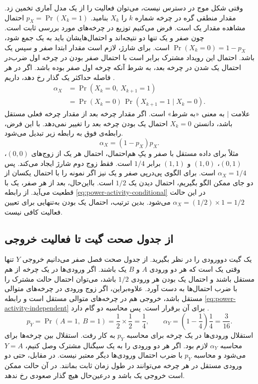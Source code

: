 وقتی شکل موج در دسترس نیست، می‌توان فعالیت را از یک مدل آماری
تخمین زد. مقدار منطقی گره در چرخه شماره \(k\) را \(X_k\) بنامید.
\(p_X=\Pr(X_k=1)\) احتمال مشاهده مقدار یک است. فرض می‌کنیم توزیع
در چرخه‌های مورد بررسی ثابت است. چون صفر و یک تنها دو نتیجه‌اند و
احتمال‌هایشان باید به یک جمع شود، \(\Pr(X_k=0)=1-p_X\) است.
برای شارژ، لازم است مقدار ابتدا صفر و سپس یک باشد. احتمال این
رویداد مشترک برابر است با احتمال صفر بودن در چرخه اول ضرب‌در
احتمال یک شدن در چرخه بعد، به شرط آنکه چرخه اول صفر بوده باشد.
اگر در هر فاصله حداکثر یک گذار رخ دهد، داریم
\cite[بخش ، صفحه ۱۸۷]{weste}
\cite[اسلایدهای ۱۴ و ۱۵]{powerslides}.
\begin{equation}
  \begin{aligned}
    \alpha_X
      &=\Pr(X_k=0,\ X_{k+1}=1)\\
      &=\Pr(X_k=0)\,\Pr(X_{k+1}=1\mid X_k=0).
  \end{aligned}
  \label{eq:power-activity-conditional}
\end{equation}
علامت \(\mid\) به معنی «به شرط» است. اگر مقدار چرخه بعد از مقدار
چرخه فعلی مستقل باشد، دانستن \(X_k=0\) احتمال یک بودن چرخه بعد را
تغییر نمی‌دهد. با این فرض، رابطه‌ی فوق به رابطه زیر تبدیل می‌شود.
\begin{equation}
  \alpha_X=(1-p_X)p_X.
  \label{eq:power-activity-independent}
\end{equation}
مثلاً برای داده مستقل با صفر و یکِ هم‌احتمال، احتمال هر یک از زوج‌های
\((0,0)\)، \((0,1)\)، \((1,0)\) و \((1,1)\) برابر \(1/4\)
است. فقط زوج دوم شارژ ایجاد می‌کند. پس \(\alpha_X=1/4\) است.
برای الگوی پی‌درپی صفر و یک نیز اگر نمونه را با احتمال یکسان از دو
جای ممکن الگو بگیریم، احتمال دیدن یک \(1/2\) است. بااین‌حال، بعد
از هر صفر، یک با قطعیت می‌آید. از رابطه
\eqref{eq:power-activity-conditional} در این حالت
\(\alpha_X=(1/2)\times1=1/2\) می‌شود. بدین ترتیب، احتمال یک بودن
به‌تنهایی برای تعیین فعالیت کافی نیست.

\subsection{از جدول صحت گیت تا فعالیت خروجی}
\label{sec:power-gate-activity}

یک گیت  دوورودی را در نظر بگیرید. از جدول صحت فصل صفر
می‌دانیم خروجی \(Y\) تنها وقتی یک است که هر دو ورودی \(A\) و
\(B\) یک باشند. اگر ورودی‌ها در یک چرخه از هم مستقل باشند و
احتمال یک بودن هر ورودی \(1/2\) باشد، می‌توان احتمال حالت مشترک
را با ضرب احتمال‌ها به دست آورد. علاوه‌براین، اگر زوج ورودی در
چرخه‌های متوالی مستقل باشد، خروجی هم در چرخه‌های متوالی مستقل است
و رابطه \eqref{eq:power-activity-independent} برای آن برقرار است.
پس محاسبه دو گام دارد
\cite[جدول  و مثال ۵.۲، صفحه ۱۸۷]{weste}.
\[
  p_Y=\Pr(A=1,\ B=1)=\frac12\times\frac12=\frac14,
  \qquad
  \alpha_Y=\left(1-\frac14\right)\frac14=\frac{3}{16}.
\]
استقلال ورودی‌ها در یک چرخه برای محاسبه \(p_Y\) به کار رفت.
استقلال بین چرخه‌ها برای محاسبه \(\alpha_Y\) لازم بود. اگر هر دو
ورودی را به یک سیگنال مشترک وصل کنیم، \(Y=A\) می‌شود و محاسبه
\(p_Y\) با ضرب احتمال ورودی‌ها دیگر معتبر نیست. در مقابل، حتی دو
ورودی مستقل در هر چرخه می‌توانند در طول زمان ثابت بمانند. در آن
حالت ممکن است خروجی یک باشد و درعین‌حال هیچ گذار صعودی رخ ندهد.

